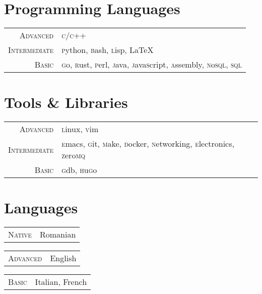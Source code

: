 \documentclass[a4paper,12pt]{article}
\begin{document}
\section{Programming Languages}
\begin{tabular}{rl}
  \textsc{Advanced}&
    \textsc{c/c++}\\
  \textsc{Intermediate}&
    \textsc{p}ython, \textsc{b}ash,
    \textsc{l}isp, \LaTeX\\
  \textsc{Basic}&
    \textsc{g}o, \textsc{r}ust,
    \textsc{p}erl, \textsc{j}ava, 
    \textsc{j}ava\textsc{s}cript,
    \textsc{a}ssembly, \textsc{n}o\textsc{sql}, 
    \textsc{sql}\\
\end{tabular}

\section{Tools \& Libraries}
\begin{tabular}{rl}
  \textsc{Advanced}&
    \textsc{l}inux, \textsc{v}im\\
  \textsc{Intermediate}&
    \textsc{e}macs, \textsc{g}it, \textsc{m}ake, 
    \textsc{d}ocker, \textsc{n}etworking,  
    \textsc{e}lectronics, \textsc{z}ero\textsc{mq}\\ 
  \textsc{Basic}&
    \textsc{g}db, \textsc{h}u\textsc{g}o \\ 
\end{tabular}



\section{Languages}
\begin{multicols}{3}
  \begin{tabular}{rl}
    \textsc{Native}&Romanian\\
  \end{tabular}
  \columnbreak

  \begin{tabular}{rl}
    \textsc{Advanced}&English\\
  \end{tabular}
  \columnbreak

  \begin{tabular}{rl}
    \textsc{Basic}&Italian, French\\
  \end{tabular}
\end{multicols}
\end{document}
